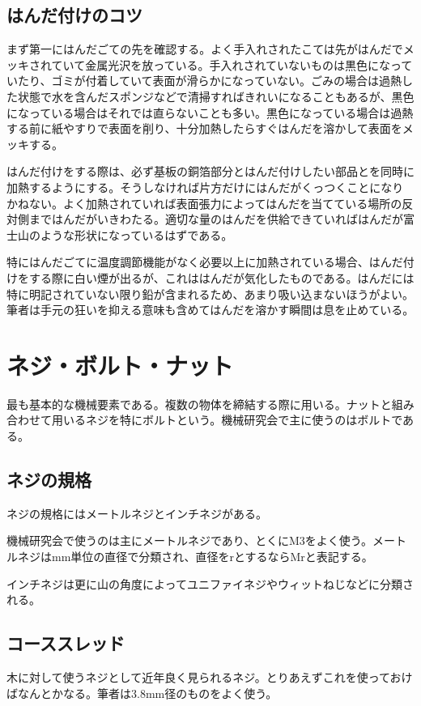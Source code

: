\documentclass[a4paper,titlepage,here]{ujarticle}
\begin{document}
\subsection{はんだ付けのコツ}
まず第一にはんだごての先を確認する。よく手入れされたこては先がはんだでメッキされていて金属光沢を放っている。手入れされていないものは黒色になっていたり、ゴミが付着していて表面が滑らかになっていない。ごみの場合は過熱した状態で水を含んだスポンジなどで清掃すればきれいになることもあるが、黒色になっている場合はそれでは直らないことも多い。黒色になっている場合は過熱する前に紙やすりで表面を削り、十分加熱したらすぐはんだを溶かして表面をメッキする。

はんだ付けをする際は、必ず基板の銅箔部分とはんだ付けしたい部品とを同時に加熱するようにする。そうしなければ片方だけにはんだがくっつくことになりかねない。よく加熱されていれば表面張力によってはんだを当てている場所の反対側まではんだがいきわたる。適切な量のはんだを供給できていればはんだが富士山のような形状になっているはずである。

特にはんだごてに温度調節機能がなく必要以上に加熱されている場合、はんだ付けをする際に白い煙が出るが、これははんだが気化したものである。はんだには特に明記されていない限り鉛が含まれるため、あまり吸い込まないほうがよい。筆者は手元の狂いを抑える意味も含めてはんだを溶かす瞬間は息を止めている。
\section{ネジ・ボルト・ナット}
最も基本的な機械要素である。複数の物体を締結する際に用いる。ナットと組み合わせて用いるネジを特にボルトという。機械研究会で主に使うのはボルトである。
\subsection{ネジの規格}
ネジの規格にはメートルネジとインチネジがある。

機械研究会で使うのは主にメートルネジであり、とくにM3をよく使う。メートルネジはmm単位の直径で分類され、直径をrとするならMrと表記する。

インチネジは更に山の角度によってユニファイネジやウィットねじなどに分類される。
\subsection{コーススレッド}
木に対して使うネジとして近年良く見られるネジ。とりあえずこれを使っておけばなんとかなる。筆者は3.8mm径のものをよく使う。
\end{document}
